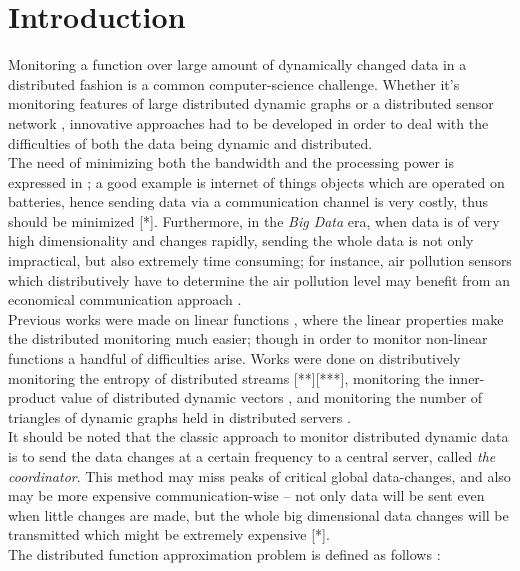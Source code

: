 \documentclass[10pt, conference]{IEEEtran}
\begin{document}
\section{Introduction}
Monitoring a function over large amount of dynamically changed data in a distributed fashion is a common computer-science challenge. Whether it's monitoring features of large distributed dynamic graphs \cite{mcgregor2015densest} or a distributed sensor network \cite{burdakis2012detecting}, innovative approaches had to be developed in order to deal with the difficulties of both the data being dynamic and distributed. \\
The need of minimizing both the bandwidth and the processing power is expressed in \cite{giatrakos2013network}; a good example is internet of things objects which are operated on batteries, hence sending data via a communication channel is very costly, thus should be minimized [*]. Furthermore, in the \textit{Big Data} era, when data is of very high dimensionality and changes rapidly, sending the whole data is not only impractical, but also extremely time consuming; for instance, air pollution sensors which distributively have to determine the air pollution level may benefit from an economical communication approach \cite{cheng2004revised}. \\
Previous works were made on linear functions \cite{keralapura2006communication}, where the linear properties make the distributed monitoring much easier; though in order to monitor non-linear functions a handful of difficulties arise. Works were done on distributively monitoring the entropy of distributed streams \cite{gabel2017anarchists}[**][***], monitoring the inner-product value of distributed dynamic vectors \cite{garofalakis2013sketch}, and monitoring the number of triangles of dynamic graphs held in distributed servers \cite{yehuda2017monitoring}. \\
It should be noted that the classic approach to monitor distributed dynamic data is to send the data changes at a certain frequency  to a central server, called \textit{the coordinator}. This method may miss peaks of critical global data-changes, and also may be more expensive communication-wise -- not only data will be sent even when little changes are made, but the whole big dimensional data changes will be transmitted which might be extremely expensive [*]. \\
The distributed function approximation problem is defined as follows \cite{garofalakis2013sketch}:
\end{document}
